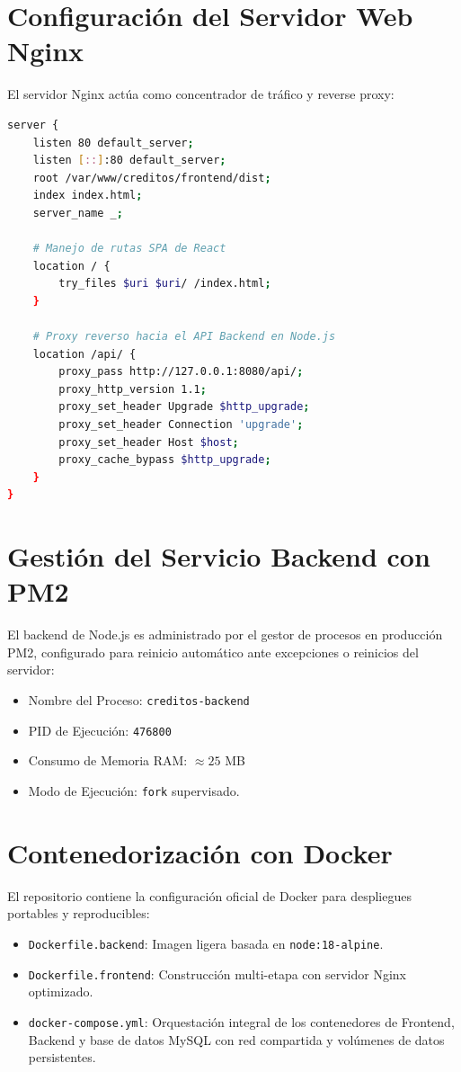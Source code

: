 \documentclass[11pt,letterpaper]{report}
\begin{document}
\section{Configuración del Servidor Web Nginx}
El servidor Nginx actúa como concentrador de tráfico y reverse proxy:
\begin{lstlisting}[language=bash]
server {
    listen 80 default_server;
    listen [::]:80 default_server;
    root /var/www/creditos/frontend/dist;
    index index.html;
    server_name _;

    # Manejo de rutas SPA de React
    location / {
        try_files $uri $uri/ /index.html;
    }

    # Proxy reverso hacia el API Backend en Node.js
    location /api/ {
        proxy_pass http://127.0.0.1:8080/api/;
        proxy_http_version 1.1;
        proxy_set_header Upgrade $http_upgrade;
        proxy_set_header Connection 'upgrade';
        proxy_set_header Host $host;
        proxy_cache_bypass $http_upgrade;
    }
}
\end{lstlisting}

\section{Gestión del Servicio Backend con PM2}
El backend de Node.js es administrado por el gestor de procesos en producción PM2, configurado para reinicio automático ante excepciones o reinicios del servidor:
\begin{itemize}
    \item Nombre del Proceso: \texttt{creditos-backend}
    \item PID de Ejecución: \texttt{476800}
    \item Consumo de Memoria RAM: $\approx 25$ MB
    \item Modo de Ejecución: \texttt{fork} supervisado.
\end{itemize}

\section{Contenedorización con Docker}
El repositorio contiene la configuración oficial de Docker para despliegues portables y reproducibles:
\begin{itemize}
    \item \texttt{Dockerfile.backend}: Imagen ligera basada en \texttt{node:18-alpine}.
    \item \texttt{Dockerfile.frontend}: Construcción multi-etapa con servidor Nginx optimizado.
    \item \texttt{docker-compose.yml}: Orquestación integral de los contenedores de Frontend, Backend y base de datos MySQL con red compartida y volúmenes de datos persistentes.
\end{itemize}
\end{document}

